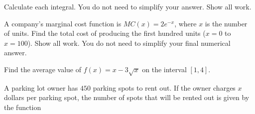\documentclass[addpoints,12pt]{exam}
\newcommand{\ds}{\displaystyle}
\begin{document}
\begin{questions}

\newpage


\question
Calculate each integral. You do not need to simplify your answer. Show all work.


\newpage

\question[9] A company's marginal cost function is $MC(x)=2e^{-x}$, where $x$ is the number of
units. Find the total cost of producing the first hundred units ($x=0$ to $x=100$). Show all work.
You do not need to simplify your final numerical answer.


\newpage

\question[7] Find the average value of $f(x)=x-3\sqrt{x}$ on the interval $[1,4]$.


\newpage

\question A parking lot owner has $450$ parking spots to rent out. If the owner charges $x$
dollars per parking spot, the number of spots that
will be rented out is given by the function


\end{questions}
\end{document}
